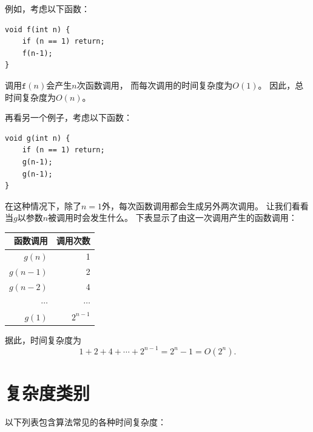 例如，考虑以下函数：
\begin{lstlisting}
void f(int n) {
    if (n == 1) return;
    f(n-1);
}
\end{lstlisting}
调用$\texttt{f}(n)$会产生$n$次函数调用，
而每次调用的时间复杂度为$O(1)$。
因此，总时间复杂度为$O(n)$。

再看另一个例子，考虑以下函数：
\begin{lstlisting}
void g(int n) {
    if (n == 1) return;
    g(n-1);
    g(n-1);
}
\end{lstlisting}
在这种情况下，除了$n=1$外，每次函数调用都会生成另外两次调用。
让我们看看当$g$以参数$n$被调用时会发生什么。
下表显示了由这一次调用产生的函数调用：
\begin{center}
\begin{tabular}{rr}
函数调用 & 调用次数 \\
\hline
$g(n)$ & 1 \\
$g(n-1)$ & 2 \\
$g(n-2)$ & 4 \\
$\cdots$ & $\cdots$ \\
$g(1)$ & $2^{n-1}$ \\
\end{tabular}
\end{center}
据此，时间复杂度为
\[1+2+4+\cdots+2^{n-1} = 2^n-1 = O(2^n).\]

\section{复杂度类别}


以下列表包含算法常见的各种时间复杂度：

